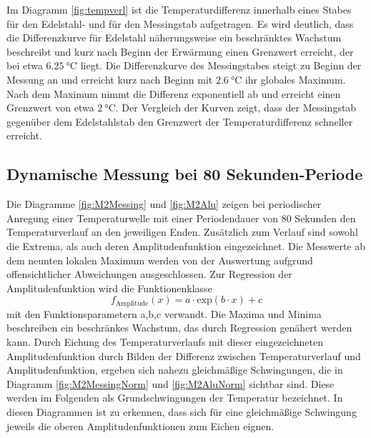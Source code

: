 Im Diagramm \ref{fig:tempverl} ist die Temperaturdifferenz innerhalb eines Stabes für den Edelstahl- und für den Messingstab aufgetragen. 
Es wird deutlich, dass die Differenzkurve für Edelstahl näherungsweise ein beschränktes Wachstum beschreibt und kurz nach Beginn der Erwärmung einen Grenzwert erreicht, der bei etwa  $\SI{6.25}{\degreeCelsius}$ liegt.
Die Differenzkurve des Messingstabes steigt zu Beginn der Messung an und erreicht kurz nach Beginn mit $\SI{2.6}{\degreeCelsius}$ ihr globales Maximum. 
Nach dem Maximum nimmt die Differenz exponentiell ab und erreicht einen Grenzwert von etwa $\SI{2}{\degreeCelsius}$.
Der Vergleich der Kurven zeigt, dass der Messingstab gegenüber dem Edelstahlstab den Grenzwert der Temperaturdifferenz schneller erreicht.

\subsection{Dynamische Messung bei 80 Sekunden-Periode}
Die Diagramme \ref{fig:M2Messing} und \ref{fig:M2Alu} zeigen bei periodischer Anregung einer Temperaturwelle mit einer Periodendauer von 80 Sekunden den Temperaturverlauf an den jeweiligen Enden. 
Zusätzlich zum Verlauf sind sowohl die Extrema, als auch deren Amplitudenfunktion eingezeichnet. 
Die Messwerte ab dem neunten lokalen Maximum werden von der Auswertung aufgrund offensichtlicher Abweichungen ausgeschlossen.
Zur Regression der Amplitudenfunktion wird die Funktionenklasse
\begin{equation}
	f_\text{Amplitude}(x)= a\cdot \mathup{exp}(b\cdot x)+c
	\label{Amplitudenklasse}
\end{equation}
mit den Funktionsparametern a,b,c verwandt.
Die Maxima und Minima beschreiben ein beschränkes Wachstum, das durch Regression \cite{scipy} genähert werden kann.
Durch Eichung des Temperaturverlaufs mit dieser eingezeichneten Amplitudenfunktion durch Bilden der Differenz zwischen Temperaturverlauf und Amplitudenfunktion, ergeben sich nahezu gleichmäßige Schwingungen, die in Diagramm \ref{fig:M2MessingNorm} und \ref{fig:M2AluNorm} sichtbar sind. 
Diese werden im Folgenden als Grundschwingungen der Temperatur bezeichnet. 
In diesen Diagrammen ist zu erkennen, dass sich für eine gleichmäßige Schwingung jeweils die oberen Amplitudenfunktionen zum Eichen eignen.
